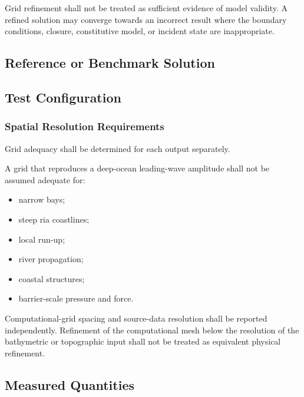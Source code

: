 Grid refinement shall not be treated as sufficient evidence of model
validity. A refined solution may converge towards an incorrect result
where the boundary conditions, closure, constitutive model, or incident
state are inappropriate.

\subsection{Reference or Benchmark Solution}
\label{sec:res-ver-cnv-reference-benchmark-solution}


\subsection{Test Configuration}
\label{sec:res-ver-cnv-test-configuration}


\subsubsection{Spatial Resolution Requirements}
\label{sec:res-ver-cnv-spatial-resolution-requirements}

Grid adequacy shall be determined for each output separately.

A grid that reproduces a deep-ocean leading-wave amplitude shall not be
assumed adequate for:

\begin{itemize}
  \item narrow bays;
  \item steep ria coastlines;
  \item local run-up;
  \item river propagation;
  \item coastal structures;
  \item barrier-scale pressure and force.
\end{itemize}

Computational-grid spacing and source-data resolution shall be reported
independently. Refinement of the computational mesh below the
resolution of the bathymetric or topographic input shall not be treated
as equivalent physical refinement.

\subsection{Measured Quantities}
\label{sec:res-ver-cnv-measured-quantities}

